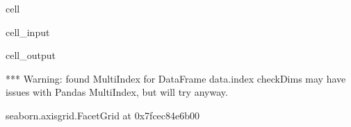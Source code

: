 \documentclass[letterpaper,table,10pt,english]{jupyterBook}
\begin{document}
\begin{sphinxuseclass}{cell}\begin{sphinxVerbatimInput}

\begin{sphinxuseclass}{cell_input}
\begin{sphinxVerbatim}[commandchars=\\\{\}]
  
     
                 
                     
\end{sphinxVerbatim}

\end{sphinxuseclass}\end{sphinxVerbatimInput}
\begin{sphinxVerbatimOutput}

\begin{sphinxuseclass}{cell_output}
\begin{sphinxVerbatim}[commandchars=\\\{\}]
*** Warning: found MultiIndex for DataFrame data.index \PYGZhy{} checkDims may have issues with Pandas MultiIndex, but will try anyway.
\end{sphinxVerbatim}

\begin{sphinxVerbatim}[commandchars=\\\{\}]
\PYGZlt{}seaborn.axisgrid.FacetGrid at 0x7fcec84e6b00\PYGZgt{}
\end{sphinxVerbatim}

\noindent{}

\end{sphinxuseclass}\end{sphinxVerbatimOutput}

\end{sphinxuseclass}
\end{document}
